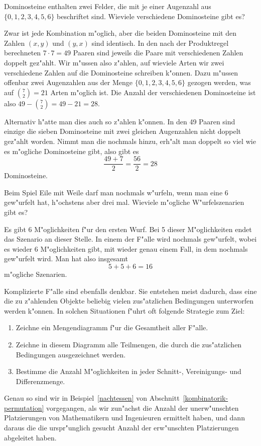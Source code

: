 \begin{beispiele}
\item Dominosteine enthalten zwei Felder, die mit je einer Augenzahl
aus $\{0,1,2,3,4,5,6\}$ beschriftet sind. Wieviele verschiedene Dominosteine
gibt es?

\begin{loesung}
Zwar ist jede Kombination m"oglich, aber die beiden Dominosteine
mit den Zahlen $(x,y)$ und $(y,x)$ sind identisch. In den nach der
Produktregel berechneten $7\cdot 7=49$ Paaren sind jeweils die Paare
mit verschiedenen Zahlen doppelt gez"ahlt. Wir m"ussen also z"ahlen,
auf wieviele Arten wir zwei verschiedene Zahlen auf die Dominosteine
schreiben k"onnen. Dazu m"ussen offenbar zwei Augenzahlen aus
der Menge $\{0,1,2,3,4,5,6\}$ gezogen werden, was auf 
$\binom{7}{2}=21$ Arten m"oglich ist. Die Anzahl der verschiedenen
Dominosteine ist also $49 - \binom{7}{2}=49-21=28$.

Alternativ h"atte man dies auch so z"ahlen k"onnen. In den 49 Paaren sind
einzige die sieben Dominosteine mit zwei gleichen Augenzahlen nicht doppelt
gez"ahlt worden. Nimmt man die nochmals hinzu, erh"alt man doppelt so viel
wie es m"ogliche Dominosteine gibt, also gibt es
\[
\frac{49+7}{2}=\frac{56}2=28
\]
Dominosteine.
\end{loesung}

\item Beim Spiel Eile mit Weile darf man nochmals w"urfeln, wenn
man eine 6 gew"urfelt hat, h"ochstens aber drei mal. Wieviele
m"ogliche W"urfelszenarien gibt es?

\begin{loesung}
Es gibt 6 M"oglichkeiten f"ur den ersten Wurf.
Bei 5 dieser M"oglichkeiten endet das Szenario an dieser Stelle.
In einem der
F"alle wird nochmals gew"urfelt, wobei es wieder 6 M"oglichkeiten
gibt, mit wieder genau einem Fall, in dem nochmals gew"urfelt wird.
Man hat also insgesamt 
\[
5 + 5 + 6=16
\]
m"ogliche Szenarien.
\end{loesung}

\end{beispiele}

Komplizierte F"alle sind ebenfalls denkbar. Sie entstehen meist dadurch, 
dass eine die zu z"ahlenden Objekte beliebig vielen zus"atzlichen
Bedingungen unterworfen werden k"onnen. In solchen Situationen
f"uhrt oft folgende Strategie zum Ziel:
\begin{enumerate}
\item Zeichne ein Mengendiagramm f"ur die Gesamtheit aller F"alle.
\item Zeichne in diesem Diagramm alle Teilmengen, die durch 
die zus"atzlichen Bedingungen ausgezeichnet werden.
\item Bestimme die Anzahl M"oglichkeiten in jeder Schnitt-, Vereinigungs-
und Differenzmenge.
\end{enumerate}
Genau so sind wir in Beispiel~\ref{nachtessen} von
Abschnitt~\ref{kombinatorik-permutation} vorgegangen,
als wir zun"achst die Anzahl der unerw"unschten Platzierungen
von Mathematikern und Ingenieuren ermittelt haben, und dann daraus
die die urspr"unglich gesucht Anzahl der erw"unschten Platzierungen
abgeleitet haben.

